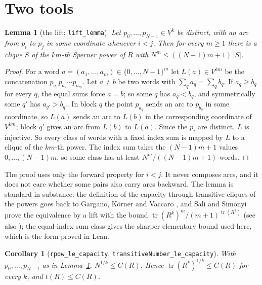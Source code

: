 \documentclass[11pt]{article}
\newtheorem{lemma}[theorem]{Lemma}
\newtheorem{corollary}[theorem]{Corollary}
\theoremstyle{definition}
\theoremstyle{remark}
\newcommand{\tr}{\operatorname{tr}}
\begin{document}
\section{Two tools}\label{sec:tools}

\begin{lemma}[the lift; \texttt{lift\_lemma}]\label{lem:lift}
Let $p_0, \dots, p_{N-1} \in V^k$ be distinct, with an arc from $p_i$ to $p_j$ in some coordinate
whenever $i < j$. Then for every $m \ge 1$ there is a clique $S$ of the $km$-th Sperner power of
$R$ with $N^m \le ((N-1)m + 1)\,|S|$.
\end{lemma}

\begin{proof}
For a word $a = (a_1, \dots, a_m) \in \{0, \dots, N-1\}^m$ let $L(a) \in V^{km}$ be the
concatenation $p_{a_1} p_{a_2} \cdots p_{a_m}$. Let $a \ne b$ be two words with
$\sum_q a_q = \sum_q b_q$. If $a_q \ge b_q$ for every $q$, the equal sums force $a = b$; so some
$q$ has $a_q < b_q$, and symmetrically some $q'$ has $a_{q'} > b_{q'}$. In block $q$ the point
$p_{a_q}$ sends an arc to $p_{b_q}$ in some coordinate, so $L(a)$ sends an arc to $L(b)$ in the
corresponding coordinate of $V^{km}$; block $q'$ gives an arc from $L(b)$ to $L(a)$. Since the
$p_i$ are distinct, $L$ is injective. So every class of words with a fixed index sum is mapped
by $L$ to a clique of the $km$-th power. The index sum takes the $(N-1)m + 1$ values
$0, \dots, (N-1)m$, so some class has at least $N^m / ((N-1)m + 1)$ words.
\end{proof}

The proof uses only the forward property for $i < j$. It never composes arcs, and it does not care
whether some pairs also carry arcs backward. The lemma is standard in substance: the definition of
the capacity through transitive cliques of the powers goes back to Gargano, K\"orner and Vaccaro
\cite{gkv}, and Sali and Simonyi \cite{ss} prove the equivalence by a lift with the bound
$\tr(R^k)^m/(m+1)^{\tr(R^k)}$ (see also \cite[Section~2.2.1]{simonyi}); the equal-index-sum class
gives the sharper elementary bound used here, which is the form proved in Lean.

\begin{corollary}[\texttt{rpow\_le\_capacity}, \texttt{transitiveNumber\_le\_capacity}]\label{cor:lower}
With $p_0, \dots, p_{N-1}$ as in Lemma~\ref{lem:lift}, $N^{1/k} \le C(R)$. Hence
$\tr(R^k)^{1/k} \le C(R)$ for every $k$, and $t(R) \le C(R)$.
\end{corollary}
\end{document}
